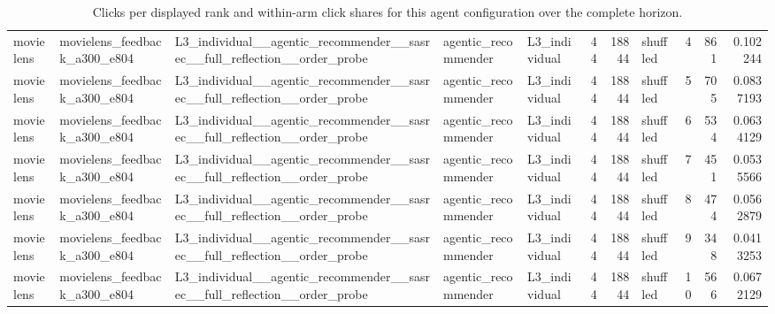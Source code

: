 \begin{table}[htbp!]
\begin{tabular}{lllllrrlrrr}
movielens & movielens\_feedback\_a300\_e804 & L3\_individual\_\_agentic\_recommender\_\_sasrec\_\_full\_reflection\_\_order\_probe & agentic\_recommender & L3\_individual & 44 & 18844 & shuffled & 4 & 861 & 0.102244 \\
movielens & movielens\_feedback\_a300\_e804 & L3\_individual\_\_agentic\_recommender\_\_sasrec\_\_full\_reflection\_\_order\_probe & agentic\_recommender & L3\_individual & 44 & 18844 & shuffled & 5 & 705 & 0.0837193 \\
movielens & movielens\_feedback\_a300\_e804 & L3\_individual\_\_agentic\_recommender\_\_sasrec\_\_full\_reflection\_\_order\_probe & agentic\_recommender & L3\_individual & 44 & 18844 & shuffled & 6 & 534 & 0.0634129 \\
movielens & movielens\_feedback\_a300\_e804 & L3\_individual\_\_agentic\_recommender\_\_sasrec\_\_full\_reflection\_\_order\_probe & agentic\_recommender & L3\_individual & 44 & 18844 & shuffled & 7 & 451 & 0.0535566 \\
movielens & movielens\_feedback\_a300\_e804 & L3\_individual\_\_agentic\_recommender\_\_sasrec\_\_full\_reflection\_\_order\_probe & agentic\_recommender & L3\_individual & 44 & 18844 & shuffled & 8 & 474 & 0.0562879 \\
movielens & movielens\_feedback\_a300\_e804 & L3\_individual\_\_agentic\_recommender\_\_sasrec\_\_full\_reflection\_\_order\_probe & agentic\_recommender & L3\_individual & 44 & 18844 & shuffled & 9 & 348 & 0.0413253 \\
movielens & movielens\_feedback\_a300\_e804 & L3\_individual\_\_agentic\_recommender\_\_sasrec\_\_full\_reflection\_\_order\_probe & agentic\_recommender & L3\_individual & 44 & 18844 & shuffled & 10 & 566 & 0.0672129 \\
\hline
\end{tabular}
\caption{Clicks per displayed rank and within-arm click shares for this agent configuration over the complete horizon.}
\label{chap:results:tab:rq3_rank_counts_l3_individual_agentic_recommender_sasrec_full_reflection_order_probe}
\end{table}
